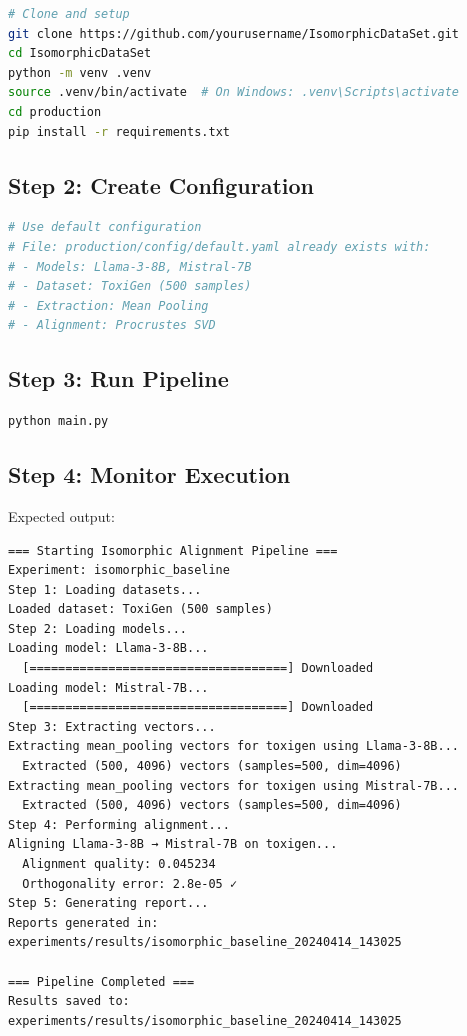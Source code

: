 \documentclass[12pt,a4paper,oneside]{report}
\begin{document}
\begin{lstlisting}[language=Bash]
# Clone and setup
git clone https://github.com/yourusername/IsomorphicDataSet.git
cd IsomorphicDataSet
python -m venv .venv
source .venv/bin/activate  # On Windows: .venv\Scripts\activate
cd production
pip install -r requirements.txt
\end{lstlisting}

\subsection{Step 2: Create Configuration}

\begin{lstlisting}[language=Bash]
# Use default configuration
# File: production/config/default.yaml already exists with:
# - Models: Llama-3-8B, Mistral-7B
# - Dataset: ToxiGen (500 samples)
# - Extraction: Mean Pooling
# - Alignment: Procrustes SVD
\end{lstlisting}

\subsection{Step 3: Run Pipeline}

\begin{lstlisting}[language=Bash]
python main.py
\end{lstlisting}

\subsection{Step 4: Monitor Execution}

Expected output:

\begin{lstlisting}
=== Starting Isomorphic Alignment Pipeline ===
Experiment: isomorphic_baseline
Step 1: Loading datasets...
Loaded dataset: ToxiGen (500 samples)
Step 2: Loading models...
Loading model: Llama-3-8B...
  [====================================] Downloaded
Loading model: Mistral-7B...
  [====================================] Downloaded
Step 3: Extracting vectors...
Extracting mean_pooling vectors for toxigen using Llama-3-8B...
  Extracted (500, 4096) vectors (samples=500, dim=4096)
Extracting mean_pooling vectors for toxigen using Mistral-7B...
  Extracted (500, 4096) vectors (samples=500, dim=4096)
Step 4: Performing alignment...
Aligning Llama-3-8B → Mistral-7B on toxigen...
  Alignment quality: 0.045234
  Orthogonality error: 2.8e-05 ✓
Step 5: Generating report...
Reports generated in: experiments/results/isomorphic_baseline_20240414_143025

=== Pipeline Completed ===
Results saved to: experiments/results/isomorphic_baseline_20240414_143025
\end{lstlisting}
\end{document}
